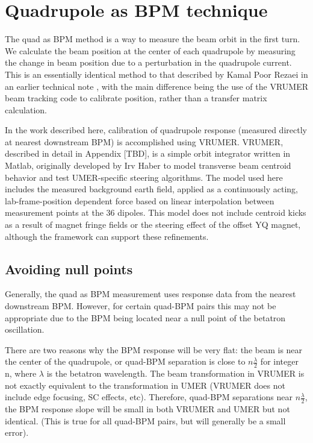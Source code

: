 \section{Quadrupole as BPM technique}

The quad as BPM method is a way to measure the beam orbit in the first turn. We calculate the beam position at the center of 
each quadrupole by measuring the change in beam position due to a perturbation in the quadrupole current. 
This is an essentially identical method to that described by Kamal Poor Rezaei in an earlier technical note \cite{KPR_note}, 
with the main difference being the use of the VRUMER beam tracking code to calibrate position, rather than a transfer matrix calculation.  



In the work described here, calibration of quadrupole response (measured directly at nearest downstream BPM) is accomplished using VRUMER. VRUMER, described in detail in Appendix [TBD], 
is a simple orbit integrator written in Matlab, originally developed by Irv Haber to model transverse beam centroid behavior and test UMER-specific steering algorithms.
The model used here includes the measured background earth field, applied as a continuously 
acting, lab-frame-position dependent force based on linear interpolation between measurement points at the 36 dipoles.
This model does not include centroid kicks as a result of magnet fringe fields or the steering effect of the offset YQ magnet, although 
the framework can support these refinements.



\subsection{Avoiding null points} \label{sec:QAB:nulls}

Generally, the quad as BPM measurement uses response data from the nearest downstream BPM. However, for certain quad-BPM pairs this may not be appropriate due to the BPM being located near a null point of the betatron oscillation. 

There are two reasons why the BPM response will be very flat: the beam is near the center of the quadrupole, or quad-BPM separation is close to $n \frac{\lambda}{2}$ for integer n, where $\lambda$ is the betatron wavelength. The beam transformation in VRUMER is not exactly equivalent to the transformation in UMER (VRUMER does not include edge focusing, SC effects, etc). Therefore, quad-BPM separations near $n \frac{\lambda}{2}$, the BPM response slope will be small in both VRUMER and UMER but not identical. (This is true for all quad-BPM pairs, but will generally be a small error). 

